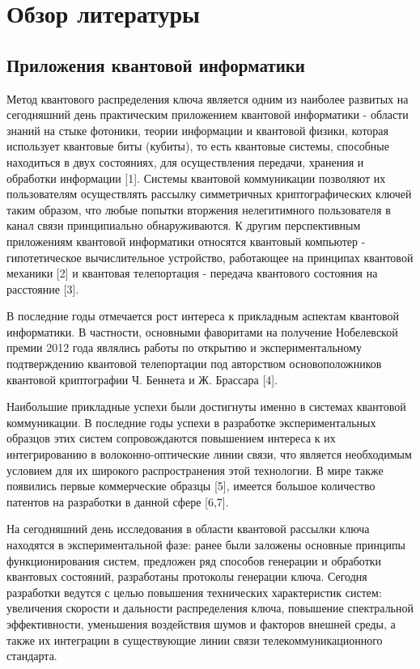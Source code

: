 \chapter{Обзор литературы} \label{ch:ch1}
\section{Приложения квантовой информатики} \label{sec:ch1/sec1}

Метод квантового распределения ключа является одним из наиболее развитых на сегодняшний день практическим приложением квантовой информатики - области знаний на стыке фотоники, теории информации и квантовой физики, которая использует квантовые биты (кубиты), то есть квантовые системы, способные находиться в двух состояниях, для осуществления передачи, хранения и обработки информации [1]. Системы квантовой коммуникации позволяют их пользователям осуществлять рассылку симметричных криптографических ключей таким образом, что любые попытки вторжения нелегитимного пользователя в канал связи принципиально обнаруживаются. К другим перспективным приложениям квантовой информатики относятся квантовый компьютер - гипотетическое вычислительное устройство, работающее на принципах квантовой механики [2] и квантовая телепортация - передача квантового состояния на расстояние [3].


В последние годы отмечается рост интереса к прикладным аспектам квантовой информатики. В частности, основными фаворитами на получение Нобелевской премии 2012 года являлись работы по открытию и экспериментальному подтверждению квантовой телепортации под авторством основоположников квантовой криптографии Ч. Беннета и Ж. Брассара [4].  


Наибольшие прикладные успехи были достигнуты именно в системах квантовой коммуникации. В последние годы успехи в разработке экспериментальных образцов этих систем сопровождаются повышением интереса к их интегрированию в волоконно-оптические линии связи, что является необходимым условием для их широкого распространения этой технологии. В мире также появились первые коммерческие образцы [5], имеется большое количество патентов на разработки в данной сфере [6,7].


На сегодняшний день исследования в области квантовой рассылки ключа находятся в экспериментальной фазе: ранее были заложены основные принципы функционирования систем, предложен ряд способов генерации и обработки квантовых состояний, разработаны протоколы генерации ключа. Сегодня разработки ведутся с целью повышения технических характеристик систем: увеличения скорости и дальности распределения ключа, повышение спектральной эффективности, уменьшения воздействия шумов и факторов внешней среды, а также их интеграции в существующие линии связи телекоммуникационного стандарта. 

